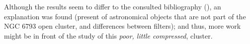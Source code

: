 \documentclass{aa}
\begin{document}
    Although the results seem to differ to the consulted bibliography (\cite{ClustersPaper}), an explanation was found (present of astronomical objects that are not part of the NGC 6793 open cluster, and differences between filters); and thus, more work might be in front of the study of this \textit{poor, little compressed}, cluster.
    \newpage

%
\nocite{*}


\end{document}
